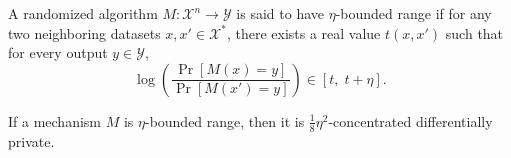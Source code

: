 A randomized algorithm $M:\mathcal{X}^n \to \mathcal{Y}$ is said to have $\eta$-bounded range if for any two neighboring datasets $x,x'\in\mathcal{X}^*$, there exists a real value $t(x,x')$ such that for every output $y\in\mathcal{Y}$,
\[
\log\!\left(\frac{\Pr[M(x)=y]}{\Pr[M(x')=y]}\right)
\in [t,\; t+\eta].
\]

If a mechanism $M$ is $\eta$-bounded range, then it is $\tfrac{1}{8}\eta^2$-concentrated differentially private.
